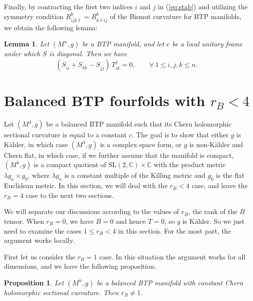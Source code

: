 \documentclass{amsart}
\newtheorem{lemma}{Lemma}
\newtheorem{proposition}{Proposition}
\begin{document}
Finally, by contracting the first two indices $i$ and $j$ in (\ref{eq:stab}) and utilizing the symmetry condition $R^b_{i\bar{j}k\bar{\ell}} = R^b_{k\bar{\ell}i\bar{j}}$ of the Bismut curvature for BTP manifolds, we obtain the following lemma:

\begin{lemma} \label{lemmastabS}
Let $(M^n,g)$ be a BTP manifold, and let $e$ be a local unitary frame under which $S$ is diagonal. Then we have
\begin{equation} \label{eq:stabS}
(S_{i\bar{i}} + S_{k\bar{k}}-S_{j\bar{j}})\,T^j_{ik} = 0, \ \ \ \ \ \ \ \ \ \forall \ 1\leq i,j,k\leq n.
\end{equation}
\end{lemma}



\vspace{0.3cm}

\section{Balanced BTP fourfolds with \texorpdfstring{$r_B<4$}{rB < 4}}

Let $(M^4,g)$ be a balanced BTP manifold such that its Chern holomorphic sectional curvature is equal to a constant $c$. The goal is to show that either $g$ is K\"ahler, in which case $(M^4,g)$ is a complex space form, or $g$ is non-K\"ahler and Chern flat, in which case, if we further assume that the manifold is compact, $(M^4,g)$ is a compact quotient of $\mbox{SL}(2,{\mathbb C}) \times {\mathbb C}$ with the product metric $\lambda g_{\kappa}\times g_0$, where $\lambda g_{\kappa}$ is a constant multiple of the Killing metric and $g_0$ is the flat Euclidean metric. In this section, we will deal with the $r_B<4$ case, and leave the $r_B=4$ case to the next two sections.

We will separate our discussions according to the values of $r_B$, the rank of the $B$ tensor. When $r_B=0$, we have $B=0$ and hence $T=0$, so $g$ is K\"ahler. So we just need to examine the cases $1\leq r_B<4$ in this section. For the most part, the argument works locally.

First let us consider the $r_B=1$ case. In this situation the argument works for all dimensions, and we have the following proposition:

\begin{proposition} \label{proprank1}
Let $(M^n,g)$ be a balanced BTP manifold with constant Chern holomorphic sectional curvature. Then $r_B\neq 1$.
\end{proposition}
\end{document}
